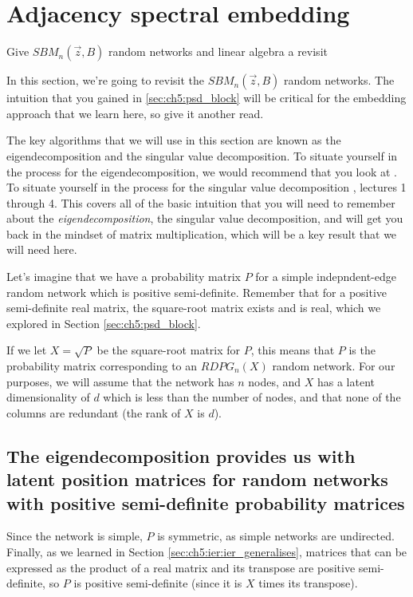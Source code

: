 \section{Adjacency spectral embedding}
\label{sec:ch6:ase}

\begin{floatingbox}[h]\caption{Give $SBM_n(\vec z, B)$ random networks and linear algebra a revisit}
In this section, we're going to revisit the $SBM_n(\vec z, B)$ random networks. The intuition that you gained in \ref{sec:ch5:psd_block} will be critical for the embedding approach that we learn here, so give it another read. 

The key algorithms that we will use in this section are known as the {eigendecomposition} and the {singular value decomposition}. To situate yourself in the process for the {eigendecomposition}, we would recommend that you look at \cite{Axler}. To situate yourself in the process for the singular value decomposition \cite{Trefethen1997}, lectures 1 through 4. This covers all of the basic intuition that you will need to remember about the \textit{eigendecomposition}, the singular value decomposition, and will get you back in the mindset of matrix multiplication, which will be a key result that we will need here.
\end{floatingbox}

Let's imagine that we have a probability matrix $P$ for a simple indepndent-edge random network which is positive semi-definite. Remember that for a positive semi-definite real matrix, the square-root matrix exists and is real, which we explored in Section \ref{sec:ch5:psd_block}. 

If we let $X = \sqrt{P}$ be the square-root matrix for $P$, this means that $P$ is the probability matrix corresponding to an $RDPG_n(X)$ random network. For our purposes, we will assume that the network has $n$ nodes, and $X$ has a latent dimensionality of $d$ which is less than the number of nodes, and that none of the columns are redundant (the rank of $X$ is $d$).

\subsection{The eigendecomposition provides us with latent position matrices for random networks with positive semi-definite probability matrices}


Since the network is simple, $P$ is symmetric, as simple networks are undirected. Finally, as we learned in Section \ref{sec:ch5:ier:ier_generalises}, matrices that can be expressed as the product of a real matrix and its transpose are positive semi-definite, so $P$ is positive semi-definite (since it is $X$ times its transpose).

